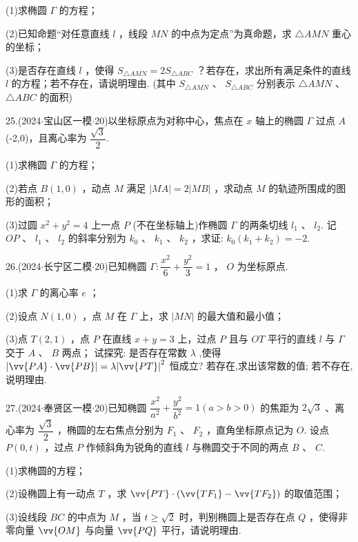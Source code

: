(1)求椭圆 $\Gamma$ 的方程；

(2)已知命题“对任意直线 $l$ ，线段 ${MN}$ 的中点为定点”为真命题，求 $\bigtriangleup  {AMN}$ 重心的坐标；

(3)是否存在直线 $l$ ，使得 ${S}_{\bigtriangleup {AMN}} = 2{S}_{\bigtriangleup {ABC}}$ ？若存在，求出所有满足条件的直线 $l$ 的方程；若不存在，请说明理由. (其中 ${S}_{\bigtriangleup {AMN}}$ 、 ${S}_{\bigtriangleup {ABC}}$ 分别表示 $\bigtriangleup  {AMN}$ 、 $\bigtriangleup  {ABC}$ 的面积)

25.(2024$\cdot$宝山区一模$\cdot$20)以坐标原点为对称中心，焦点在 $x$ 轴上的椭圆 $\Gamma$ 过点 $A$ (-2,0)，且离心率为 $\dfrac{\sqrt{3}}{2}$.

(1)求椭圆 $\Gamma$ 的方程；

(2)若点 $B\left( {1,0}\right)$ ，动点 $M$ 满足 $\left| {MA}\right|  = 2\left| {MB}\right|$ ，求动点 $M$ 的轨迹所围成的图形的面积；

(3)过圆 ${x}^{2} + {y}^{2} = 4$ 上一点 $P$ (不在坐标轴上)作椭圆 $\Gamma$ 的两条切线 ${l}_{1}$ 、 ${l}_{2}$. 记 ${OP}$ 、 ${l}_{1}$ 、 ${l}_{2}$ 的斜率分别为 ${k}_{0}$ 、 ${k}_{1}$ 、 ${k}_{2}$ ，求证: ${k}_{0}\left( {{k}_{1} + {k}_{2}}\right)  =  - 2$.

26.(2024$\cdot$长宁区二模$\cdot$20)已知椭圆 $\Gamma  : \dfrac{{x}^{2}}{6} + \dfrac{{y}^{2}}{3} = 1$ ， $O$ 为坐标原点.

(1)求 $\Gamma$ 的离心率 $e$ ；

(2)设点 $N\left( {1,0}\right)$ ，点 $M$ 在 $\Gamma$ 上，求 $\left| {MN}\right|$ 的最大值和最小值；

(3)点 $T\left( {2,1}\right)$ ，点 $P$ 在直线 $x + y = 3$ 上，过点 $P$ 且与 ${OT}$ 平行的直线 $l$ 与 $\Gamma$ 交于 $A$ 、 $B$ 两点； 试探究: 是否存在常数 $\lambda$ ,使得 $\left| {\vv{PA} \cdot  \vv{PB}}\right|  = \lambda {\left| \vv{PT}\right| }^{2}$ 恒成立? 若存在,求出该常数的值; 若不存在, 说明理由.

27.(2024$\cdot$奉贤区一模$\cdot$20)已知椭圆 $\dfrac{{x}^{2}}{{a}^{2}} + \dfrac{{y}^{2}}{{b}^{2}} = 1\left( {a > b > 0}\right)$ 的焦距为 $2\sqrt{3}$ 、离心率为 $\dfrac{\sqrt{3}}{2}$ ，椭圆的左右焦点分别为 ${F}_{1}$ 、 ${F}_{2}$ ，直角坐标原点记为 $O$. 设点 $P\left( {0,t}\right)$ ，过点 $P$ 作倾斜角为锐角的直线 $l$ 与椭圆交于不同的两点 $B$ 、 $C$.

(1)求椭圆的方程；

(2)设椭圆上有一动点 $T$ ，求 $\vv{PT} \cdot  \left( {\vv{T{F}_{1}} - \vv{T{F}_{2}}}\right)$ 的取值范围；

(3)设线段 ${BC}$ 的中点为 $M$ ，当 $t \geq  \sqrt{2}$ 时，判别椭圆上是否存在点 $Q$ ，使得非零向量 $\vv{OM}$ 与向量 $\vv{PQ}$ 平行，请说明理由.


